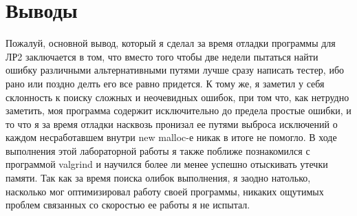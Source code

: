 \section{Выводы}

Пожалуй, основной вывод, который я сделал за время отладки программы для ЛР2
заключается в том, что вместо того чтобы две недели пытаться найти ошибку различными альтернативными путями лучше сразу написать тестер, ибо рано или поздно
делть его все равно придется. К тому же, я заметил у себя склонность к поиску
сложных и неочевидных ошибок, при том что, как нетрудно заметить, моя программа содержит исключительно до предела простые ошибки, и то что я за время отладки
насквозь пронизал ее путями выброса исключений о каждом несработавшем внутри
new malloc-е никак в итоге не помогло. В ходе выполнения этой лабораторной работы я также поближе познакомился с программой valgrind и научился более ли менее
успешно отыскивать утечки памяти. Так как за время поиска олибок выполнения,
я заодно натолько, насколько мог оптимизировал работу своей программы, никаких
ощутимых проблем связанных со скоростью ее работы я не испытал.
\pagebreak
